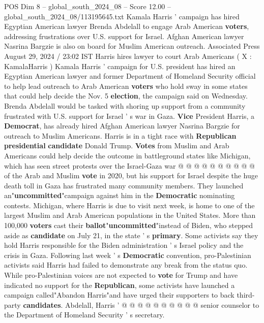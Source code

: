 \begin{textsample}{POS Dim 8 – global\_south\_2024\_08 – Score 12.00 – global\_south\_2024\_08/113195645.txt}  \label{ex:f8_pos_173}
Kamala Harris ' campaign has hired Egyptian American lawyer Brenda Abdelall to engage Arab American \textbf{voters}, addressing frustrations over U.S. support for Israel.
Afghan American lawyer Nasrina Bargzie is also on board for Muslim American outreach.
Associated Press August 29, 2024 / 23:02 IST Harris hires lawyer to court Arab Americans ( X : KamalaHarris ) Kamala Harris ' campaign for U.S. president has hired an Egyptian American lawyer and former Department of Homeland Security official to help lead outreach to Arab American \textbf{voters} who hold sway in some states that could help decide the Nov. 5 \textbf{election}, the campaign said on Wednesday.
Brenda Abdelall would be tasked with shoring up support from a community frustrated with U.S. support for Israel ' s war in Gaza. \textbf{Vice} President Harris, a \textbf{Democrat}, has already hired Afghan American lawyer Nasrina Bargzie for outreach to Muslim Americans.
Harris is in a tight race with \textbf{Republican} \textbf{presidential} \textbf{candidate} Donald Trump. \textbf{Votes} from Muslim and Arab Americans could help decide the outcome in battleground states like Michigan, which has seen street protests over the Israel-Gaza war @ @ @ @ @ @ @ @ @ @ of the Arab and Muslim \textbf{vote} in 2020, but his support for Israel despite the huge death toll in Gaza has frustrated many community members.
They launched an"\textbf{uncommitted}"campaign against him in the \textbf{Democratic} nominating contests.
Michigan, where Harris is due to visit next week, is home to one of the largest Muslim and Arab American populations in the United States.
More than 100,000 \textbf{voters} cast their \textbf{ballot}"\textbf{uncommitted}"instead of Biden, who stepped aside as \textbf{candidate} on July 21, in the state ' s \textbf{primary}.
Some activists say they hold Harris responsible for the Biden administration ' s Israel policy and the crisis in Gaza.
Following last week ' s \textbf{Democratic} convention, pro-Palestinian activists said Harris had failed to demonstrate any break from the status quo.
While pro-Palestinian voices are not expected to \textbf{vote} for Trump and have indicated no support for the \textbf{Republican}, some activists have launched a campaign called"Abandon Harris"and have urged their supporters to back third-party \textbf{candidates}.
Abdelall, Harris ' @ @ @ @ @ @ @ @ @ @ senior counselor to the Department of Homeland Security ' s secretary.

\end{textsample}
